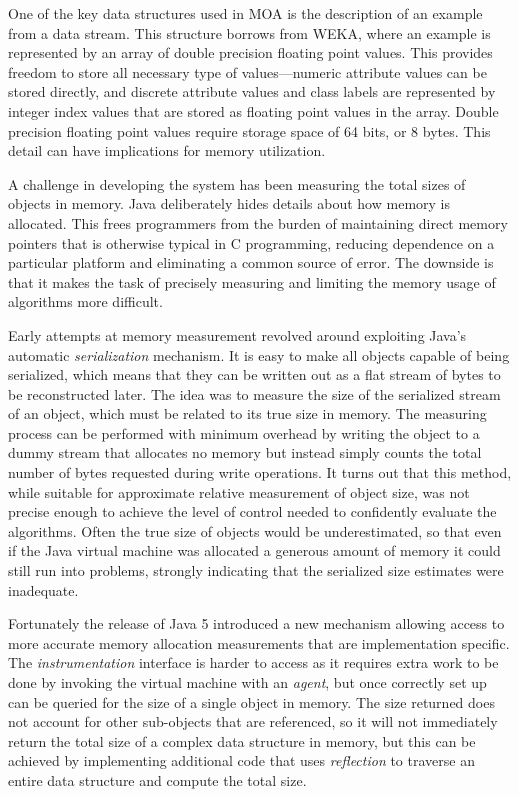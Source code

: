 One of the key data structures used in MOA is the description of an example from a data stream. This structure borrows from WEKA, where an example is represented by an array of double precision floating point values. This provides freedom to store all necessary type of values---numeric attribute values can be stored directly, and discrete attribute values and class labels are represented by integer index values that are stored as floating point values in the array. Double precision floating point values require storage space of 64 bits, or 8 bytes. This detail can have implications for memory utilization.

A challenge in developing the system has been measuring the total sizes of objects in memory. Java deliberately hides details about how memory is allocated. This frees programmers from the burden of maintaining direct memory pointers that is otherwise typical in C programming, reducing dependence on a particular platform and eliminating a common source of error. The downside is that it makes the task of precisely measuring and limiting the memory usage of algorithms more difficult. 

Early attempts at memory measurement revolved around exploiting Java's automatic {\em serialization} mechanism. It is easy to make all objects capable of being serialized, which means that they can be written out as a flat stream of bytes to be reconstructed later. The idea was to measure the size of the serialized stream of an object, which must be related to its true size in memory. The measuring process can be performed with minimum overhead by writing the object to a dummy stream that allocates no memory but instead simply counts the total number of bytes requested during write operations. It turns out that this method, while suitable for approximate relative measurement of object size, was not precise enough to achieve the level of control needed to confidently evaluate the algorithms. Often the true size of objects would be underestimated, so that
even if the Java virtual machine was allocated a generous amount of memory it could still run into problems, strongly indicating that the serialized size estimates were inadequate.

Fortunately the release of Java 5 introduced a new mechanism allowing access to more accurate memory allocation measurements that are implementation specific. The {\em instrumentation} interface is harder to access as it requires extra work to be done by invoking the virtual machine with an {\em agent}, but once correctly set up can be queried for the size of a single object in memory. The size returned does not account for other sub-objects that are referenced, so it will not immediately return the total size of a complex data structure in memory, but this can be achieved by implementing additional code that uses {\em reflection} to traverse an entire data structure and compute the total size.

